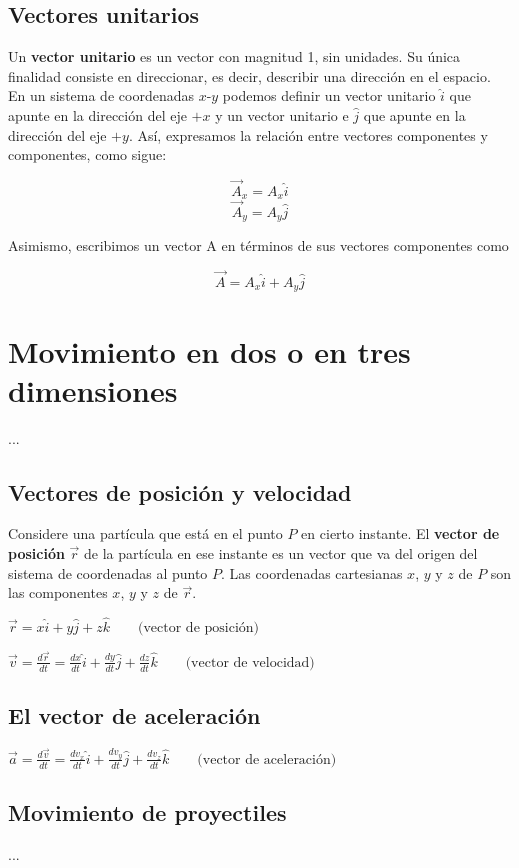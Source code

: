 \documentclass{article}
\newcommand{\newsection}[1]{
    \pagebreak
    {\color{sectionColor}
    \centering
    \section{\bl{#1}}}
    \color{black}
    \vspace{0.5cm}
}
\newcommand{\newsubsection}[1]{
    \vspace{0.5cm}
    \color{sectionColor}
    \subsection{\bl{#1}}
    \color{black}
    \vspace{0.5cm}
}
\newcommand{\bl}[1]{\textbf{#1}}
\newcommand{\definicion}[1]{%
    \vspace{0.5cm}
    \begin{definicionbox}
        #1
    \end{definicionbox}
    \vspace{0.5cm}
}
\begin{document}
    \newsubsection{Vectores unitarios}

    \par Un \bl{vector unitario} es un vector con magnitud 1, sin unidades. Su única ﬁnalidad consiste en direccionar, es decir, describir una dirección en el espacio. En un sistema de coordenadas $x$-$y$ podemos deﬁnir un vector unitario $\hat{i}$ que apunte en la dirección del eje $+x$ y un vector unitario e $\hat{j}$ que apunte en la dirección del eje $+y$. Así, expresamos la relación entre vectores componentes y componentes, como sigue:

    \[ \vec{A}_x = A_x \hat{i} \]
    \[ \vec{A}_y = A_y \hat{j} \]

    Asimismo, escribimos un vector A en términos de sus vectores componentes como

    \[ \vec{A} = A_x \hat{i} + A_y \hat{j} \]

\newsection{Movimiento en dos o en tres dimensiones}

    \par ... %

    \newsubsection{Vectores de posición y velocidad}

    \par Considere una partícula que está en el punto $P$ en cierto instante. El \bl{vector de posición} $\vec{r}$ de la partícula en ese instante es un vector que va del origen del sistema de coordenadas al punto $P$. Las coordenadas cartesianas $x$, $y$ y $z$ de $P$ son las componentes $x$, $y$ y $z$ de $\vec{r}$.

    \definicion{
        \centering
        \( \vec{r} = x \hat{i} + y \hat{j} + z \hat{k} \quad \quad \text{(vector de posición)} \)
    }
    
    \definicion{
        \centering
        \( \vec{v} = \frac{d \vec{r}}{dt} = \frac{dx}{dt} \hat{i} + \frac{dy}{dt} \hat{j} + \frac{dz}{dt} \hat{k} \quad \quad \text{(vector de velocidad)} \)
    }

    \newsubsection{El vector de aceleración}

    \definicion{
        \centering
        \( \vec{a} = \frac{d \vec{v}}{dt} = \frac{dv_x}{dt} \hat{i} + \frac{dv_y}{dt} \hat{j} + \frac{dv_z}{dt} \hat{k} \quad \quad \text{(vector de aceleración)} \)
    }

    \newsubsection{Movimiento de proyectiles}

    \par ... %

    \pagebreak
\end{document}
